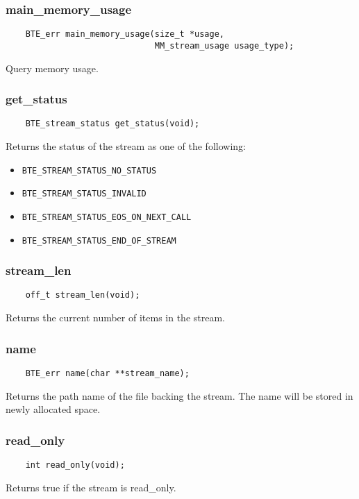 \subsubsection{main\_memory\_usage}
\begin{verbatim}
    BTE_err main_memory_usage(size_t *usage,
                              MM_stream_usage usage_type);
\end{verbatim}
Query memory usage.



\subsubsection{get\_status}
\begin{verbatim}
    BTE_stream_status get_status(void);
\end{verbatim}
Returns the status of the stream as one
of the following:
\begin{itemize}
\item \verb|BTE_STREAM_STATUS_NO_STATUS|
\item \verb|BTE_STREAM_STATUS_INVALID|
\item \verb|BTE_STREAM_STATUS_EOS_ON_NEXT_CALL|
\item \verb|BTE_STREAM_STATUS_END_OF_STREAM|
\end{itemize}


\subsubsection{stream\_len}
\begin{verbatim}
    off_t stream_len(void);
\end{verbatim}
Returns the current number of items in the stream.


\subsubsection{name}
\begin{verbatim}
    BTE_err name(char **stream_name);
\end{verbatim}
Returns the path name of the file backing the stream. The name will be
stored in newly allocated space.


\subsubsection{read\_only}
\begin{verbatim}
    int read_only(void);
\end{verbatim}
Returns true if the stream is read\_only.

